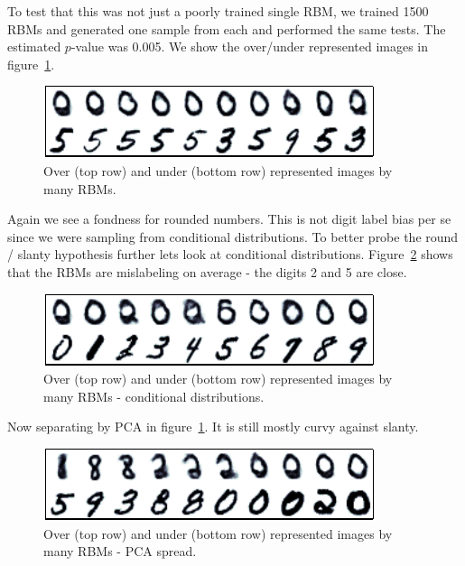 \documentclass{article}
\begin{document}
To test that this was not just a poorly trained single RBM, we trained 1500 RBMs and generated one sample from each and performed the same tests.
The estimated $p$-value was 0.005.
We show the over/under represented images in figure~\ref{fig:many_rbm_over_under}.

\begin{figure}[ht]
\centering
\includegraphics[width=0.98\columnwidth]{figures/many_rbm_over_under}
\caption{
Over (top row) and under (bottom row) represented images by many RBMs.
}
\label{fig:many_rbm_over_under}
\end{figure}

Again we see a fondness for rounded numbers.
This is not digit label bias per se since we were sampling from conditional distributions.
To better probe the round / slanty hypothesis further lets look at conditional distributions.
Figure~\ref{fig:many_rbm_over_under_digit} shows that the RBMs are mislabeling on average - the digits 2 and 5 are close.

\begin{figure}[ht]
\centering
\includegraphics[width=0.98\columnwidth]{figures/many_rbm_over_under_digit}
\caption{
Over (top row) and under (bottom row) represented images by many RBMs - conditional distributions.
}
\label{fig:many_rbm_over_under_digit}
\end{figure}

Now separating by PCA in figure~\ref{fig:many_rbm_over_under}.
It is still mostly curvy against slanty.

\begin{figure}[ht]
\centering
\includegraphics[width=0.98\columnwidth]{figures/many_rbm_over_under_pca}
\caption{
Over (top row) and under (bottom row) represented images by many RBMs - PCA spread.
}
\label{fig:many_rbm_over_under_pca}
\end{figure}
\end{document}
